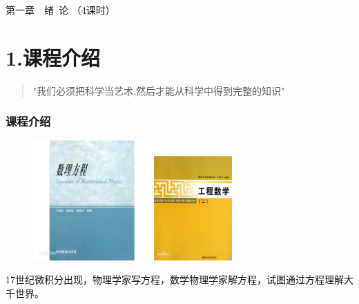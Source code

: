 	\begin{frame}
		\frametitle{}
		\Background[1] 
	    \begin{center}
		{ {\Huge 第一章~~绪~论 （4课时）}}
	    \end{center}    
		\addtocounter{framenumber}{-1} 		
	\end{frame}


\section{1.课程介绍}

\begin{frame} 
	\begin{quotation}
		"我们必须把科学当艺术,然后才能从科学中得到完整的知识"  \\
		\rightline{$\cdots$ [德国]~ 歌德 \hspace{3em}}   
	\end{quotation}
\end{frame}

\begin{frame}
\frametitle{课程介绍}
	\begin{center}
		\begin{figure}
		\begin{minipage}[t]{0.4\textwidth}
			\includegraphics[width=4.5cm]{figs/fig1-2.png}	
		\end{minipage}
		\begin{minipage}[t]{0.4\textwidth}
			\includegraphics[width=3.0cm]{figs/fig1-2-2.png}	
		\end{minipage}
		\end{figure}
	17世纪微积分出现，物理学家写方程，数学物理学家解方程，试图通过方程理解大千世界。
  	\end{center}
\end{frame}

